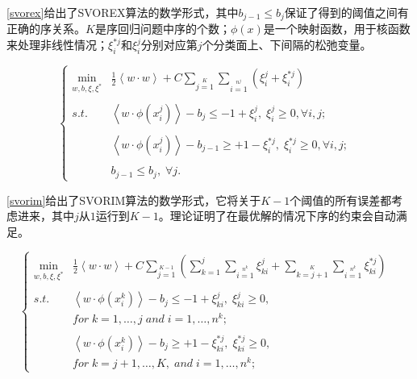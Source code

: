 \autoref{svorex}给出了SVOREX算法的数学形式，其中\(b_{j-1} \leq b_{j}\)保证了得到的阈值之间有正确的序关系。\(K\)是序回归问题中序的个数；\(\phi(x)\)是一个映射函数，用于核函数来处理非线性情况；\(\xi_{i}^{*j}\)和\(\xi_{i}^{j}\)分别对应第\(j\)个分类面上、下间隔的松弛变量。

\begin{equation}
\label{svorex}
\left\{\begin{array}{rll} \mathop{\min}\limits_{w,b,\xi,\xi^{*}} & {\frac{1}{2}\left \langle w \cdot w  \right \rangle + C\mathop{\sum}\limits_{j=1}\limits^{K}\mathop{\sum}\limits_{i=1}\limits^{n^{j}}\left (\xi_{i}^{j}+\xi_{i}^{*j}\right )}  & \\
\\
s.t. & \left \langle w \cdot \phi(x_{i}^{j})  \right \rangle - b_{j} \leq -1 + \xi_{i}^{j}, \; \xi_{i}^{j} \geq 0,\forall i,j; \\ \\
     & \left \langle w \cdot \phi(x_{i}^{j})  \right \rangle - b_{j-1} \geq +1 - \xi_{i}^{*j}, \; \xi_{i}^{*j} \geq 0,\forall i,j;\\ \\
     & b_{j-1} \leq b_{j}, \; \forall j.

\end{array}
\right.
\end{equation}

\autoref{svorim}给出了SVORIM算法的数学形式，它将关于\(K-1\)个阈值的所有误差都考虑进来，其中\(j\)从\(1\)运行到\(K-1\)。\citep{chu2007support}理论证明了在最优解的情况下序的约束会自动满足。

\begin{equation}
\label{svorim}
\left\{\begin{array}{rll} \mathop{\min}\limits_{w,b,\xi,\xi^{*}} & {\frac{1}{2}\left \langle w \cdot w  \right \rangle + C\mathop{\sum}\limits_{j=1}\limits^{K-1}{\left (\mathop{\sum}\limits_{k=1}^{j}{\mathop{\sum}\limits_{i=1}\limits^{n^{k}}{\xi_{ki}^{j}}} + \mathop{\sum}\limits_{k=j+1}\limits^{K}{\mathop{\sum}\limits_{i=1}\limits^{n^{k}}{\xi_{ki}^{*j}}}\right)}}  & \\
\\
s.t. & \left \langle w \cdot \phi(x_{i}^{k})  \right \rangle - b_{j} \leq -1 + \xi_{ki}^{j}, \; \xi_{ki}^{j} \geq 0, \\
     & for\; k=1,\dots,j\; and\; i=1,\dots,n^{k}; \\ \\
     & \left \langle w \cdot \phi(x_{i}^{k})  \right \rangle - b_{j} \geq +1 - \xi_{ki}^{*j}, \; \xi_{ki}^{*j} \geq 0, \\
     & for\; k=j+1,\dots,K,\; and \; i=1,\dots,n^{k};

\end{array}
\right.
\end{equation}


